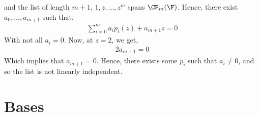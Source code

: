 \documentclass{book}
\begin{document}
\begin{enumerate}[label=\arabic*)]
        and the list of length $m + 1$, $1, z, \dots, z^{m}$ spans $\CP_m(\F)$. Hence, there exist $a_0, \dots, a_{m + 1}$ such that,
        \begin{align*}
          \sum_{i = 0}^{m}a_ip_i(z) + a_{m + 1}z = 0
        \end{align*}
        With not all $a_i = 0$. Now, at $z = 2$, we get,
        \begin{align*}
          2a_{m + 1} = 0
        \end{align*}
        Which implies that $a_{m + 1} = 0$. Hence, there exists some $p_i$ such that $a_i \neq 0$, and so the list is not linearly independent.
  \end{enumerate}
\section{Bases}
\end{document}

